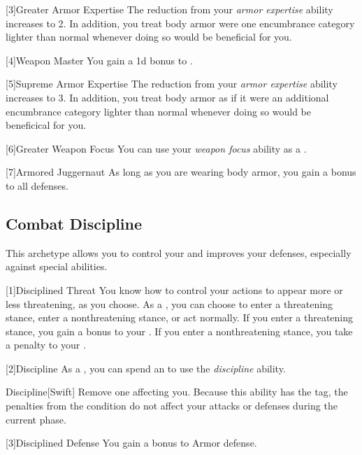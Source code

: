         [3]{Greater Armor Expertise}
        The  reduction from your \textit{armor expertise} ability increases to 2.
        In addition, you treat body armor were one encumbrance category lighter than normal whenever doing so would be beneficial for you.

        [4]{Weapon Master}
        You gain a \plus1d bonus to .

        [5]{Supreme Armor Expertise}
        The  reduction from your \textit{armor expertise} ability increases to 3.
        In addition, you treat body armor as if it were an additional encumbrance category lighter than normal whenever doing so would be beneficical for you.

        [6]{Greater Weapon Focus} You can use your \textit{weapon focus} ability as a .

        [7]{Armored Juggernaut}
        As long as you are wearing body armor, you gain a  bonus to all defenses.

    \subsection{Combat Discipline}
        This archetype allows you to control your  and improves your defenses, especially against special abilities.

        [1]{Disciplined Threat}
        You know how to control your actions to appear more or less threatening, as you choose.
        As a , you can choose to enter a threatening stance, enter a nonthreatening stance, or act normally.
        If you enter a threatening stance, you gain a  bonus to your .
        If you enter a nonthreatening stance, you take a  penalty to your .

        [2]{Discipline} As a , you can spend an  to use the \textit{discipline} ability.
        \begin{ability}{Discipline}[Swift]
            Remove one  affecting you.
            Because this ability has the  tag, the penalties from the condition do not affect your attacks or defenses during the current phase.
        \end{ability}

        [3]{Disciplined Defense}
        You gain a  bonus to Armor defense.

